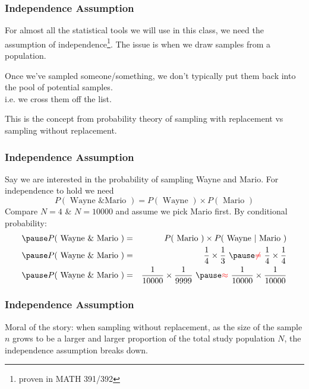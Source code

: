 \documentclass[slides]{beamer}
\newcommand{\blue}[1]{\textcolor{blue2}{#1}}
\newcommand{\red}[1]{\textcolor{red}{#1}}
\begin{document}
\begin{frame}[fragile]
\frametitle{Independence Assumption}
For almost \blue{all} the statistical tools we will use in this class, we need the assumption of independence\footnote{proven in MATH 391/392}.  The issue is when we draw samples from a population.  

\vspace{0.5cm}
\pause
Once we've sampled someone/something, we don't typically \blue{put them back} into the pool of potential samples.\\
i.e. we cross them off the list.  

\vspace{0.5cm}
\pause
This is the concept from probability theory of \blue{sampling with replacement} vs \blue{sampling without replacement}. 

\end{frame}


\begin{frame}[fragile]
\frametitle{Independence Assumption}

Say we are interested in the probability of sampling Wayne and Mario.  For independence to hold we need
\[
P(\mbox{ Wayne \& Mario }) = P(\mbox{ Wayne }) \times P(\mbox{ Mario })
\]
\pause
Compare $N=4$ \& $N=10000$ and assume we pick Mario first.  By conditional probability:
\begin{eqnarray*}
\pause P(\mbox{ Wayne \& Mario }) &=& P(\mbox{ Mario }) \times P(\mbox{ Wayne }|\mbox{ Mario }) \\
\pause P(\mbox{ Wayne \& Mario }) &=& \frac{1}{4}\times\frac{1}{3} \ \pause \red{\neq} \  \frac{1}{4}\times\frac{1}{4}\\
\pause P(\mbox{ Wayne \& Mario }) &=& \frac{1}{10000}\times\frac{1}{9999} \ \pause \red{\approx} \ \frac{1}{10000}\times\frac{1}{10000}
\end{eqnarray*}


\end{frame}


\begin{frame}[fragile]
\frametitle{Independence Assumption}

\blue{Moral of the story}:  when sampling without replacement, as the size of the sample $n$ grows to be a larger and larger proportion of the total study population $N$, the independence assumption breaks down.  

\end{frame}
\end{document}
